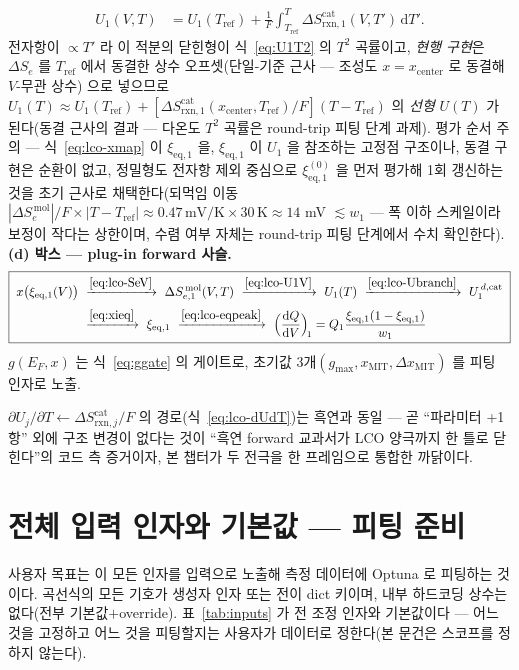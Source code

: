 \documentclass[11pt,a4paper]{article}
\newcommand{\dd}{\mathrm{d}}
\newcommand{\eq}{\mathrm{eq}}
\newcommand{\rxn}{\mathrm{rxn}}
\begin{document}
\begin{enumerate}[label=(\roman*),leftmargin=2.2em,itemsep=1pt]
\begin{equation}
\begin{aligned}
U_1(V,T)&=U_1(T_\mathrm{ref})+\frac1F\int_{T_\mathrm{ref}}^{T}\Delta S_{\rxn,1}^\mathrm{cat}(V,T')\,\dd T'.
\end{aligned}
\label{eq:lco-U1V}
\end{equation}
전자항이 $\propto T'$ 라 이 적분의 닫힌형이 식~\eqref{eq:U1T2} 의 $T^2$ 곡률이고, \emph{현행 구현}은
$\Delta S_e$ 를 $T_\mathrm{ref}$ 에서 동결한 상수 오프셋(단일-기준 근사 — 조성도 $x{=}x_\mathrm{center}$ 로
동결해 $V$-무관 상수)
으로 넣으므로 $U_1(T)\approx U_1(T_\mathrm{ref})+[\Delta S_{\rxn,1}^\mathrm{cat}(x_\mathrm{center},T_\mathrm{ref})/F]
(T-T_\mathrm{ref})$ 의 \emph{선형} $U(T)$ 가 된다(동결 근사의 결과 — 다온도 $T^2$ 곡률은 round-trip 피팅 단계 과제). 평가 순서 주의 — 식~\eqref{eq:lco-xmap} 이
$\xi_{\eq,1}$ 을, $\xi_{\eq,1}$ 이 $U_1$ 을 참조하는 고정점 구조이나, 동결 구현은 순환이 없고, 정밀형도
전자항 제외 중심으로 $\xi_{\eq,1}^{(0)}$ 을 먼저 평가해 1회 갱신하는 것을 초기 근사로 채택한다(되먹임
이동 $|\Delta S_e^{\,\mathrm{mol}}|/F\times|T-T_\mathrm{ref}|\approx0.47\,\mathrm{mV/K}\times30\,\mathrm K
\approx14$ mV $\lesssim w_1$ — 폭 이하 스케일이라 보정이 작다는 상한이며, 수렴 여부 자체는 round-trip
피팅 단계에서 수치 확인한다). \textbf{(d) 박스 — plug-in forward 사슬.}
\begin{equation}
\boxed{\;\begin{aligned}
x\big(\xi_{\eq,1}(V)\big)\ &\xrightarrow{\eqref{eq:lco-SeV}}\ \Delta S_{e,1}^{\,\mathrm{mol}}(V,T)
\ \xrightarrow{\eqref{eq:lco-U1V}}\ U_1(T)\ \xrightarrow{\eqref{eq:lco-Ubranch}}\ U_1^{\,d,\mathrm{cat}}\\[2pt]
&\xrightarrow{\eqref{eq:xieq}}\ \xi_{\eq,1}\ \xrightarrow{\eqref{eq:lco-eqpeak}}\
\Big(\frac{\dd Q}{\dd V}\Big)_{\!1}=Q_1\frac{\xi_{\eq,1}(1-\xi_{\eq,1})}{w_1}
\end{aligned}\;}
\label{eq:lco-plugin}
\end{equation}
$g(E_F,x)$ 는 식~\eqref{eq:ggate} 의 게이트로, 초기값 3개$(g_{\max},x_\mathrm{MIT},\Delta x_\mathrm{MIT})$
를 피팅 인자로 노출.
\end{enumerate}
$\partial U_j/\partial T\leftarrow\Delta S_{\rxn,j}^\mathrm{cat}/F$ 의 경로(식~\eqref{eq:lco-dUdT})는 흑연과 동일 —
곧 ``파라미터 +1 항'' 외에 구조 변경이 없다는 것이 ``흑연 forward 교과서가 LCO 양극까지 한 틀로 닫힌다''의
코드 측 증거이자, 본 챕터가 두 전극을 한 프레임으로 통합한 까닭이다.

\section{전체 입력 인자와 기본값 — 피팅 준비}
사용자 목표는 이 모든 인자를 입력으로 노출해 측정 데이터에 Optuna 로 피팅하는 것이다. 곡선식의 모든 기호가 생성자 인자
또는 전이 dict 키이며, 내부 하드코딩 상수는 없다(전부 기본값$+$override). 표~\ref{tab:inputs} 가 전 조정 인자와
기본값이다 — 어느 것을 고정하고 어느 것을 피팅할지는 사용자가 데이터로 정한다(본 문건은 스코프를 정하지 않는다).
\end{document}
